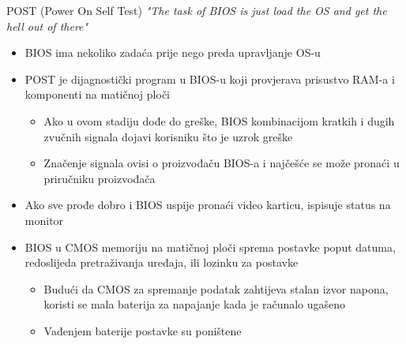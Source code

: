 \documentclass[croatian,t]{beamer} %
\begin{document}
    \begin{frame}{POST (Power On Self Test)}
    	\emph{"The task of BIOS is just load the OS and get the hell out of there"}
    	\begin{itemize}
    		\item BIOS ima nekoliko zadaća prije nego preda upravljanje OS-u
    		\item POST je dijagnostički program u BIOS-u koji provjerava prisustvo RAM-a i komponenti na matičnoj ploči
    		\begin{itemize}
    			\item Ako u ovom stadiju dođe do greške, BIOS kombinacijom  kratkih i dugih zvučnih signala dojavi korisniku što je uzrok greške
    			\item Značenje signala ovisi o proizvođaču BIOS-a i najčešće se može pronaći u priručniku proizvođača
    		\end{itemize}
    		\item Ako sve prođe dobro i BIOS uspije pronaći video karticu, ispisuje status na monitor
			\item BIOS u CMOS memoriju na matičnoj ploči sprema postavke poput datuma, redoslijeda pretraživanja uređaja, ili lozinku za postavke
			\begin{itemize}
			\item Budući da CMOS za spremanje podatak zahtijeva stalan izvor napona, koristi se mala baterija za napajanje kada je računalo ugašeno
			\item Vađenjem baterije postavke su poništene		
			\end{itemize}
    	\end{itemize}
    \end{frame}
    
\end{document}
